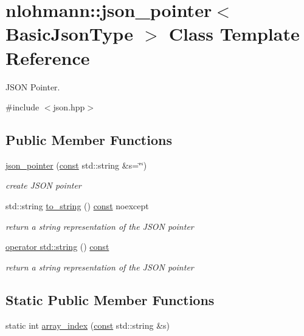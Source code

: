 \hypertarget{classnlohmann_1_1json__pointer}{}\section{nlohmann\+:\+:json\+\_\+pointer$<$ Basic\+Json\+Type $>$ Class Template Reference}
\label{classnlohmann_1_1json__pointer}


J\+S\+ON Pointer.  




{\ttfamily \#include $<$json.\+hpp$>$}

\subsection*{Public Member Functions}
\begin{DoxyCompactItemize}
\item 
\hyperlink{classnlohmann_1_1json__pointer_a7f32d7c62841f0c4a6784cf741a6e4f8}{json\+\_\+pointer} (\hyperlink{functions__c_8js_afacfd9c985d225bb07483b887a801b6f}{const} std\+::string \&s=\char`\"{}\char`\"{})
\begin{DoxyCompactList}\small\item\em create J\+S\+ON pointer \end{DoxyCompactList}\item 
std\+::string \hyperlink{classnlohmann_1_1json__pointer_ad7d3a3a215db8fe0964e644a918dcccb}{to\+\_\+string} () \hyperlink{functions__c_8js_afacfd9c985d225bb07483b887a801b6f}{const} noexcept
\begin{DoxyCompactList}\small\item\em return a string representation of the J\+S\+ON pointer \end{DoxyCompactList}\item 
\hyperlink{classnlohmann_1_1json__pointer_a1c4a7d93216a5de8966e757b34bab64d}{operator std\+::string} () \hyperlink{functions__c_8js_afacfd9c985d225bb07483b887a801b6f}{const} 
\begin{DoxyCompactList}\small\item\em return a string representation of the J\+S\+ON pointer \end{DoxyCompactList}\end{DoxyCompactItemize}
\subsection*{Static Public Member Functions}
\begin{DoxyCompactItemize}
\item 
static int \hyperlink{classnlohmann_1_1json__pointer_ac53f5b79dd91da78743c437832f57ce4}{array\+\_\+index} (\hyperlink{functions__c_8js_afacfd9c985d225bb07483b887a801b6f}{const} std\+::string \&s)
\end{DoxyCompactItemize}
